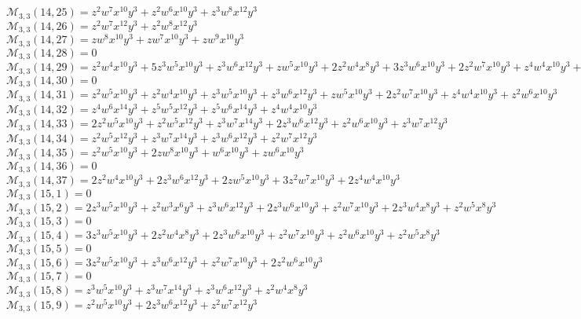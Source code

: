 $\mathcal{M}_{3,3}(14,25)=z^2w^7x^{10}y^3+z^2w^6x^{10}y^3+z^3w^8x^{12}y^3$\\
$\mathcal{M}_{3,3}(14,26)=z^2w^7x^{12}y^3+z^2w^8x^{12}y^3$\\
$\mathcal{M}_{3,3}(14,27)=zw^8x^{10}y^3+zw^7x^{10}y^3+zw^9x^{10}y^3$\\
$\mathcal{M}_{3,3}(14,28)=0$\\
$\mathcal{M}_{3,3}(14,29)=z^2w^4x^{10}y^3+5z^3w^5x^{10}y^3+z^3w^6x^{12}y^3+zw^5x^{10}y^3+2z^2w^4x^8y^3+3z^3w^6x^{10}y^3+2z^2w^7x^{10}y^3+z^4w^4x^{10}y^3+z^2w^5x^8y^3$\\
$\mathcal{M}_{3,3}(14,30)=0$\\
$\mathcal{M}_{3,3}(14,31)=z^2w^5x^{10}y^3+z^2w^4x^{10}y^3+z^3w^5x^{10}y^3+z^3w^6x^{12}y^3+zw^5x^{10}y^3+2z^2w^7x^{10}y^3+z^4w^4x^{10}y^3+z^2w^6x^{10}y^3$\\
$\mathcal{M}_{3,3}(14,32)=z^4w^6x^{14}y^3+z^5w^5x^{12}y^3+z^5w^6x^{14}y^3+z^4w^4x^{10}y^3$\\
$\mathcal{M}_{3,3}(14,33)=2z^2w^5x^{10}y^3+z^2w^5x^{12}y^3+z^3w^7x^{14}y^3+2z^3w^6x^{12}y^3+z^2w^6x^{10}y^3+z^3w^7x^{12}y^3$\\
$\mathcal{M}_{3,3}(14,34)=z^2w^5x^{12}y^3+z^3w^7x^{14}y^3+z^3w^6x^{12}y^3+z^2w^7x^{12}y^3$\\
$\mathcal{M}_{3,3}(14,35)=z^2w^5x^{10}y^3+2zw^8x^{10}y^3+w^6x^{10}y^3+zw^6x^{10}y^3$\\
$\mathcal{M}_{3,3}(14,36)=0$\\
$\mathcal{M}_{3,3}(14,37)=2z^2w^4x^{10}y^3+2z^3w^6x^{12}y^3+2zw^5x^{10}y^3+3z^2w^7x^{10}y^3+2z^4w^4x^{10}y^3$\\
$\mathcal{M}_{3,3}(15,1)=0$\\
$\mathcal{M}_{3,3}(15,2)=2z^3w^5x^{10}y^3+z^2w^3x^6y^3+z^3w^6x^{12}y^3+2z^3w^6x^{10}y^3+z^2w^7x^{10}y^3+2z^3w^4x^8y^3+z^2w^5x^8y^3$\\
$\mathcal{M}_{3,3}(15,3)=0$\\
$\mathcal{M}_{3,3}(15,4)=3z^3w^5x^{10}y^3+2z^2w^4x^8y^3+2z^3w^6x^{10}y^3+z^2w^7x^{10}y^3+z^2w^6x^{10}y^3+z^2w^5x^8y^3$\\
$\mathcal{M}_{3,3}(15,5)=0$\\
$\mathcal{M}_{3,3}(15,6)=3z^2w^5x^{10}y^3+z^3w^6x^{12}y^3+z^2w^7x^{10}y^3+2z^2w^6x^{10}y^3$\\
$\mathcal{M}_{3,3}(15,7)=0$\\
$\mathcal{M}_{3,3}(15,8)=z^3w^5x^{10}y^3+z^3w^7x^{14}y^3+z^3w^6x^{12}y^3+z^2w^4x^8y^3$\\
$\mathcal{M}_{3,3}(15,9)=z^2w^5x^{10}y^3+2z^3w^6x^{12}y^3+z^2w^7x^{12}y^3$\\
